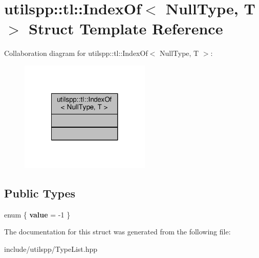 \hypertarget{structutilspp_1_1tl_1_1IndexOf_3_01NullType_00_01T_01_4}{\section{utilspp\-:\-:tl\-:\-:Index\-Of$<$ Null\-Type, T $>$ Struct Template Reference}
\label{structutilspp_1_1tl_1_1IndexOf_3_01NullType_00_01T_01_4}
}


Collaboration diagram for utilspp\-:\-:tl\-:\-:Index\-Of$<$ Null\-Type, T $>$\-:
\nopagebreak
\begin{figure}[H]
\begin{center}
\leavevmode
\includegraphics[width=176pt]{structutilspp_1_1tl_1_1IndexOf_3_01NullType_00_01T_01_4__coll__graph}
\end{center}
\end{figure}
\subsection*{Public Types}
\begin{DoxyCompactItemize}
\item 
enum \{ {\bfseries value} = -\/1
 \}
\end{DoxyCompactItemize}


The documentation for this struct was generated from the following file\-:\begin{DoxyCompactItemize}
\item 
include/utilspp/Type\-List.\-hpp\end{DoxyCompactItemize}
